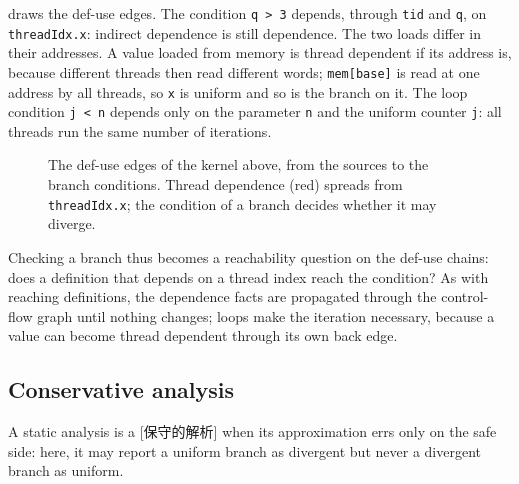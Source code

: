 \documentclass[../main.tex]{subfiles}
\begin{document}
 draws the def-use edges.  The condition
\texttt{q > 3} depends, through \texttt{tid} and \texttt{q}, on
\texttt{threadIdx.x}: indirect dependence is still dependence.  The two loads
differ in their addresses.  A value loaded from memory is thread
dependent if its address is, because different threads then read
different words; \texttt{mem[base]} is read at one address by all
threads, so \texttt{x} is uniform and so is the branch on it.  The loop condition \texttt{j < n} depends
only on the parameter \texttt{n} and the uniform counter \texttt{j}:
all threads run the same number of iterations.

\begin{figure}[tb]
  \centering
  
  \caption{The def-use edges of the kernel above, from the sources to
    the branch conditions.  Thread dependence (red) spreads from
    \texttt{threadIdx.x}; the condition of a branch decides whether it
    may diverge.}
  \label{fig:l11-divergence}
\end{figure}

Checking a branch thus becomes a reachability question on the def-use
chains: does a definition that depends on a thread index reach the
condition?  As with reaching definitions, the dependence facts are
propagated through the control-flow graph until nothing changes; loops
make the iteration necessary, because a value can become thread
dependent through its own back edge.

\subsection{Conservative analysis}

\begin{definition}
  \label{def:l11-conservative}
  A static analysis is a [保守的解析] when
  its approximation errs only on the safe side: here, it may report a
  uniform branch as divergent but never a divergent branch as uniform.
\end{definition}
\end{document}
